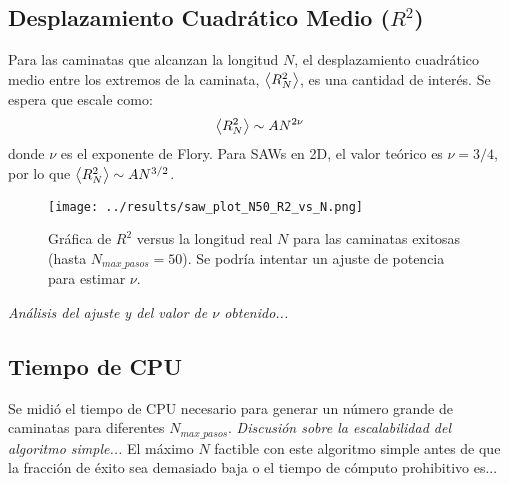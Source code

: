 \documentclass[11pt,a4paper]{article}
\begin{document}
\subsection{Desplazamiento Cuadrático Medio ($R^2$)}
Para las caminatas que alcanzan la longitud $N$, el desplazamiento cuadrático medio entre los extremos de la caminata, $\expval{R_N^2}$, es una cantidad de interés. Se espera que escale como:
\begin{equation}
    \expval{R_N^2} \sim A N^{2\nu}
\end{equation}
donde $\nu$ es el exponente de Flory. Para SAWs en 2D, el valor teórico es $\nu = 3/4$, por lo que $\expval{R_N^2} \sim A N^{3/2}$.
\begin{figure}[h!]
    \centering
    \texttt{[image: ../results/saw\_plot\_N50\_R2\_vs\_N.png]} %
    \caption{Gráfica de $R^2$ versus la longitud real $N$ para las caminatas exitosas (hasta $N_{max\_pasos}=50$). Se podría intentar un ajuste de potencia para estimar $\nu$.}
    \label{fig:saw_r2_vs_n}
\end{figure}
\textit{Análisis del ajuste y del valor de $\nu$ obtenido...}

\subsection{Tiempo de CPU}
Se midió el tiempo de CPU necesario para generar un número grande de caminatas para diferentes $N_{max\_pasos}$.
\textit{Discusión sobre la escalabilidad del algoritmo simple...} El máximo $N$ factible con este algoritmo simple antes de que la fracción de éxito sea demasiado baja o el tiempo de cómputo prohibitivo es...
\end{document}
